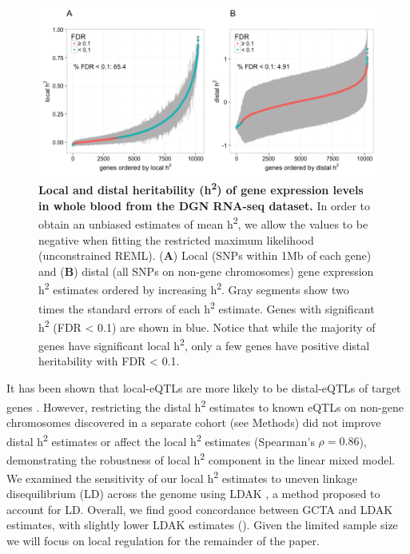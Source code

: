 \documentclass[10pt,letterpaper]{article}
\begin{document}
\begin{figure}[H]
\includegraphics[width=12cm]{Figures/Fig-DGN-jt-h2-UNCONSTRAINED.png}
\caption{{\bf  Local and distal heritability  (h\textsuperscript{2}) of gene expression levels in whole blood from the DGN RNA-seq dataset.} 
In order to obtain an unbiased estimates of mean h\textsuperscript{2}, we allow the values to be negative when fitting the restricted maximum likelihood (unconstrained REML). (\textbf{A}) Local (SNPs within 1Mb of each gene) and (\textbf{B}) distal (all SNPs on non-gene chromosomes) gene expression h\textsuperscript{2} estimates ordered by increasing h\textsuperscript{2}. Gray segments show two times the standard errors of each h\textsuperscript{2} estimate. Genes with significant h\textsuperscript{2} (FDR \textless{} 0.1) are shown in blue. Notice that while the majority of genes have significant local h\textsuperscript{2}, only a few genes have positive distal heritability with FDR \textless{} 0.1. }
\label{fig-dgn-jt-h2}
\end{figure}

It has been shown that local-eQTLs are more likely to be distal-eQTLs of target genes \cite{pierce2014mediation}. However, restricting the distal h\textsuperscript{2} estimates to known eQTLs  on non-gene chromosomes discovered in a separate cohort (see Methods) did not improve distal h\textsuperscript{2} estimates or affect the local h\textsuperscript{2} estimates (Spearman's $\rho = 0.86$), demonstrating the robustness of local h\textsuperscript{2} component in the linear mixed model. We examined the sensitivity of our local h\textsuperscript{2} estimates to uneven linkage disequilibrium (LD) across the genome using LDAK \cite{speed2012improved}, a method proposed to account for LD. Overall, we find good concordance between GCTA and LDAK estimates, with slightly lower LDAK estimates (). Given the limited sample size we will focus on local regulation for the remainder of the paper.
\end{document}
